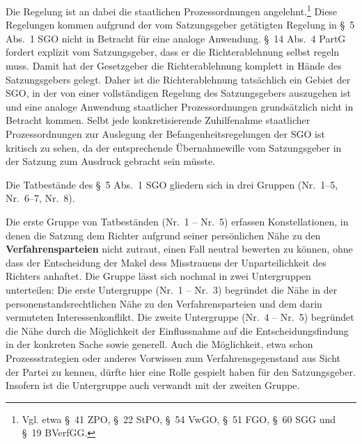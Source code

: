 Die Regelung ist an dabei die staatlichen Prozessordnungen angelehnt.\footnote{Vgl. etwa \S~41 ZPO,  \S~22 StPO, \S~54 VwGO, \S~51 FGO, \S~60 SGG und \S~19 BVerfGG.}
Diese Regelungen kommen aufgrund der vom Satzungsgeber getätigten Regelung in \S~5 Abs.~1 SGO nicht in Betracht für eine analoge Anwendung.
\S~14 Abs.~4 PartG fordert explizit vom Satzungsgeber, dass er die Richterablehnung selbst regeln muss.
Damit hat der Gesetzgeber die Richterablehnung komplett in Hände des Satzungsgebers gelegt.
Daher ist die Richterablehnung tatsächlich ein Gebiet der SGO, in der von einer vollständigen Regelung des Satzungsgebers auszugehen ist und eine analoge Anwendung staatlicher Prozessordnungen grundsätzlich nicht in Betracht kommen.
Selbt jede konkretisierende Zuhilfenahme staatlicher Prozessordnungen zur Auslegung der Befangenheitsregelungen der SGO ist kritisch zu sehen, da der entsprechende Übernahmewille vom Satzungsgeber in der Satzung zum Ausdruck gebracht sein müsste.

Die Tatbestände des \S~5 Abs.~1 SGO gliedern sich in drei Gruppen (Nr.~1--5, Nr.~6--7, Nr.~8).

Die erste Gruppe von Tatbeständen (Nr.~1 -- Nr.~5) erfassen Konstellationen, in denen die Satzung dem Richter aufgrund seiner persönlichen Nähe zu den \textbf{Verfahrensparteien} nicht zutraut, einen Fall neutral bewerten zu können, ohne dass der Entscheidung der Makel dess Misstrauens der Unparteilichkeit des Richters anhaftet.
Die Gruppe lässt sich nochmal in zwei Untergruppen unterteilen:
Die erste Untergruppe (Nr.~1 -- Nr.~3) begründet die Nähe in der personenstandsrechtlichen Nähe zu den Verfahrensparteien und dem darin vermuteten Interessenkonflikt.
Die zweite Untergruppe (Nr.~4 -- Nr.~5) begründet die Nähe durch die Möglichkeit der Einflussnahme auf die Entscheidungsfindung in der konkreten Sache sowie generell.
Auch die Möglichkeit, etwa schon Prozessstrategien oder anderes Vorwissen zum Verfahrensgegenstand aus Sicht der Partei zu kennen, dürfte hier eine Rolle gespielt haben für den Satzungsgeber.
Insofern ist die Untergruppe auch verwandt mit der zweiten Gruppe.

